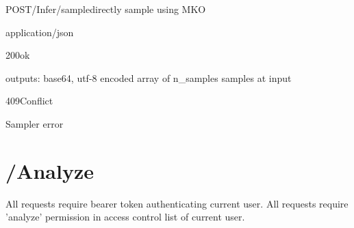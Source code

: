 \documentclass[12pt, etter]{article}
\begin{document}
\begin{apiRoute}{POST}{/Infer/sample}{directly sample using MKO}
    \begin{routeParameter}
    \end{routeParameter}
    \begin{routeResponse}{application/json}
        \begin{routeResponseItem}{200}{ok}
            \begin{routeResponseItemBody}
                outputs: base64, utf-8 encoded array of {n_samples} samples at {input}
            \end{routeResponseItemBody}
        \end{routeResponseItem}
        \begin{routeResponseItem}{409}{Conflict}
            \begin{routeResponseItemBody}
                Sampler error
            \end{routeResponseItemBody}
        \end{routeResponseItem}
    \end{routeResponse}
\end{apiRoute}


\section{/Analyze}
All requests require bearer token authenticating current user.
All requests require 'analyze' permission in access control list of current user.
\end{document}
